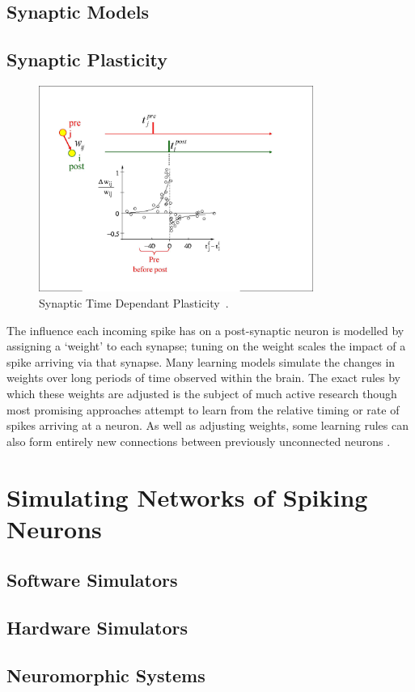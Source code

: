 \subsection{Synaptic Models}
\subsection{Synaptic Plasticity}


\begin{figure}[bt]
	\centering
	\includegraphics[width=0.8\textwidth]{pics_snn/fig_stdp_orig.jpg}
	\caption{Synaptic Time Dependant Plasticity~\cite{gerstner2014neuronal}.}
	\label{Fig:STDP}
\end{figure}
The influence each incoming spike has on a post-synaptic neuron is modelled by assigning a `weight' to each synapse;
tuning on the weight scales the impact of a spike
arriving via that synapse.
Many learning models simulate the changes in weights over long periods of time observed within the brain.
The exact rules by which these weights are adjusted is the subject of much active research though most promising approaches attempt to learn from the relative timing \cite{pfister2006triplets} or rate \cite{bienenstock1982theory} of spikes arriving at a neuron.
As well as adjusting weights, some learning rules can also form entirely new connections between previously unconnected
neurons \cite{bamford2010synaptic}.

\section{Simulating Networks of Spiking Neurons}
\label{sec:snn_sim}
\subsection{Software Simulators}
\subsection{Hardware Simulators}
\subsection{Neuromorphic Systems}
\label{sec:morph}

